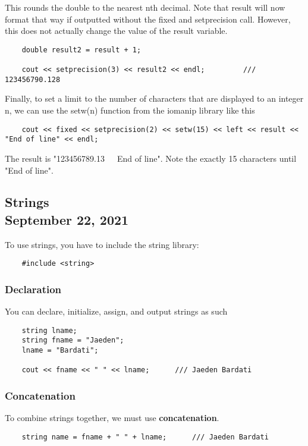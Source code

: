 \documentclass[]{article}
\begin{document}
This rounds the double to the nearest nth decimal. Note that result will now format that way if outputted without the fixed and setprecision call. However, this does not actually change the value of the result variable. 

\begin{lstlisting}
	double result2 = result + 1;
	
	cout << setprecision(3) << result2 << endl;			/// 123456790.128
\end{lstlisting}
\bigbreak

Finally, to set a limit to the number of characters that are displayed to an integer n, we can use the setw(n) function from the iomanip library like this

\begin{lstlisting}
	cout << fixed << setprecision(2) << setw(15) << left << result << "End of line" << endl;
\end{lstlisting}
\bigbreak

The result is "123456789.13~~~End of line". Note the exactly 15 characters until "End of line".

\subsection{Strings\\ {\large \normalfont September 22, 2021}}
\bigbreak

To use strings, you have to include the string library:

\begin{lstlisting}
	#include <string>
\end{lstlisting}

\subsubsection{Declaration}

You can declare, initialize, assign, and output strings as such
\begin{lstlisting}
	string lname;
	string fname = "Jaeden";
	lname = "Bardati";
	
	cout << fname << " " << lname;		/// Jaeden Bardati
\end{lstlisting}

\subsubsection{Concatenation}

To combine strings together, we must use \textbf{concatenation}.
\begin{lstlisting}
	string name = fname + " " + lname;		/// Jaeden Bardati
\end{lstlisting}
\bigbreak
\end{document}
